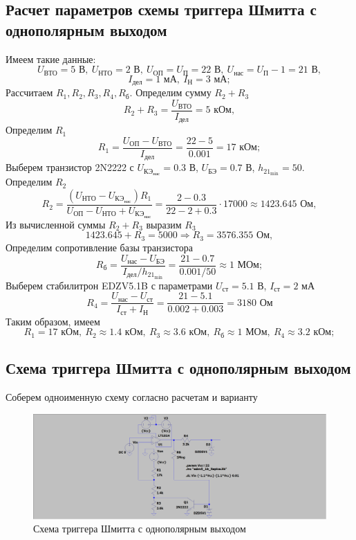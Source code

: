 \documentclass[a4paper, 12pt]{article}
\begin{document}
    \subsection{Расчет параметров схемы триггера Шмитта с однополярным выходом}
    Имеем такие данные: 
    $$
    U_\text{ВТО}=5\text{ В},\ U_\text{НТО}=2\text{ В},\ U_\text{ОП}=U_\text{П}=22\text{ В},\ U_\text{нас}=U_\text{П}-1=21\text{ В},
    $$
    $$
    I_\text{дел}=1\text{ мА},\ I_\text{Н}=3\text{ мА};
    $$
    Рассчитаем $R_1,R_2,R_3,R_4,R_\text{б}$. Определим сумму $R_2+R_3$
    $$
    R_2+R_3=\dfrac{U_\text{ВТО}}{I_\text{дел}}=5\text{ кОм},
    $$
    Определим $R_1$
    $$
    R_1=\dfrac{U_\text{ОП}-U_\text{ВТО}}{I_\text{дел}}=\dfrac{22-5}{0.001}=17\text{ кОм};
    $$
    Выберем транзистор 2N2222 с $U_{\text{КЭ}_\text{нас}}=0.3$ В, $U_\text{БЭ}=0.7$ В, $h_{21_\text{min}}=50$. Определим $R_2$
    $$
    R_2=\dfrac{\left( U_\text{НТО}-U_{\text{КЭ}_\text{нас}} \right)R_1}{U_\text{ОП}-U_\text{НТО}+U_{\text{КЭ}_\text{нас}}}=\dfrac{2-0.3}{22-2+0.3}\cdot17000\approx1423.645\text{ Ом},
    $$
    Из вычисленной суммы $R_2+R_3$ выразим $R_3$
    $$
    1423.645+R_3=5000\Rightarrow R_3=3576.355\text{ Ом},
    $$
    Определим сопротивление базы транзистора
    $$
    R_\text{б}=\dfrac{U_\text{нас}-U_\text{БЭ}}{I_\text{дел}/h_{21_\text{min}}}=\dfrac{21-0.7}{0.001/50}\approx1\text{ МОм};
    $$
    Выберем стабилитрон EDZV5.1B с параметрами $U_\text{ст}=5.1$ В, $I_\text{ст}=2$ мА
    $$
    R_4=\dfrac{U_\text{нас}-U_\text{ст}}{I_\text{ст}+I_\text{Н}}=\dfrac{21-5.1}{0.002+0.003}=3180\text{ Ом}
    $$
    Таким образом, имеем
    $$
    R_1=17\text{ кОм},\ R_2\approx1.4\text{ кОм},\ R_3\approx3.6\text{ кОм},\ R_\text{б}\approx1\text{ МОм},\ R_4\approx3.2\text{ кОм};
    $$


    \subsection{Схема триггера Шмитта с однополярным выходом}
    Соберем одноименную схему согласно расчетам и варианту
    \begin{figure}[H]
        \centering
        \includegraphics[scale=0.22]{scheme10.png}
        \captionsetup{skip=0pt}
        \caption{Схема триггера Шмитта с однополярным выходом}
        \label{fig:scheme10}
    \end{figure}
\end{document}

